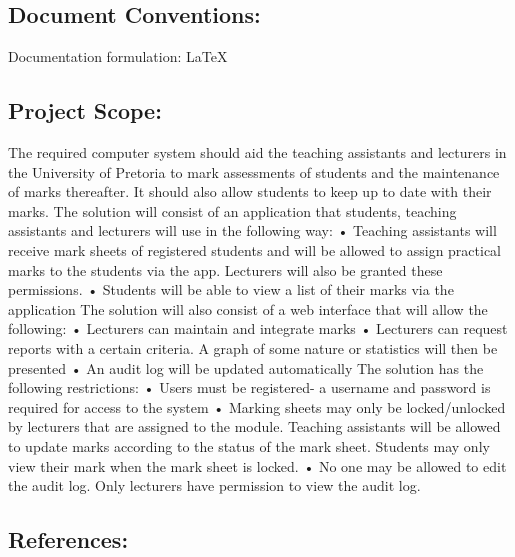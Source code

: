 \documentclass[12pt]{article}
\begin{document}
		\subsection{Document Conventions:} %
		\vspace{0.1in}
		Documentation formulation: LaTeX
	
	\vspace{0.2in}
	
		\subsection{Project Scope:} %
		\vspace{0.1in}
		The required computer system should aid the teaching assistants and lecturers in the University of Pretoria to mark assessments of students and the maintenance of marks thereafter. It should also allow students to keep up to date with their marks.
		The solution will consist of an application that students, teaching assistants and lecturers will use in the following way:
		•	Teaching assistants will receive mark sheets of registered students and will be allowed to assign practical marks to the students via the app. Lecturers will also be granted these permissions.
		•	Students will be able to view a list of their marks via the application
		The solution will also consist of a web interface that will allow the following:
		•	Lecturers can maintain and integrate marks
		•	Lecturers can request reports with a certain criteria. A graph of some nature or statistics will then be presented 
		•	An audit log will be updated automatically 
		The solution has the following restrictions:
		•	Users must be registered- a username and password is required for access to the system
		•	Marking sheets may only be locked/unlocked by lecturers that are assigned to the module. Teaching assistants will be allowed to update marks according to the status of the mark sheet. Students may only view their mark when the mark sheet is locked.
		•	No one may be allowed to edit the audit log. Only lecturers have permission to view the audit log.
		
		
	
	\vspace{0.2in}
	
		\subsection{References:}
		\vspace{0.1in}
			
\end{document}
